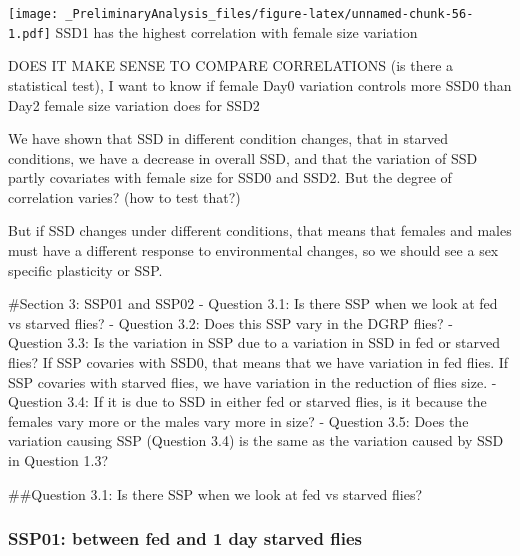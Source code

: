 \documentclass[
]{article}
\newenvironment{Shaded}{\begin{snugshade}}{\end{snugshade}}
\newcommand{\CommentTok}[1]{\textcolor[rgb]{0.56,0.35,0.01}{\textit{#1}}}
\newcommand{\DataTypeTok}[1]{\textcolor[rgb]{0.13,0.29,0.53}{#1}}
\newcommand{\DecValTok}[1]{\textcolor[rgb]{0.00,0.00,0.81}{#1}}
\newcommand{\KeywordTok}[1]{\textcolor[rgb]{0.13,0.29,0.53}{\textbf{#1}}}
\newcommand{\NormalTok}[1]{#1}
\newcommand{\OperatorTok}[1]{\textcolor[rgb]{0.81,0.36,0.00}{\textbf{#1}}}
\newcommand{\OtherTok}[1]{\textcolor[rgb]{0.56,0.35,0.01}{#1}}
\newcommand{\StringTok}[1]{\textcolor[rgb]{0.31,0.60,0.02}{#1}}
\begin{document}
\texttt{[image: \_PreliminaryAnalysis\_files/figure-latex/unnamed-chunk-56-1.pdf]}
SSD1 has the highest correlation with female size variation

DOES IT MAKE SENSE TO COMPARE CORRELATIONS (is there a statistical
test), I want to know if female Day0 variation controls more SSD0 than
Day2 female size variation does for SSD2

We have shown that SSD in different condition changes, that in starved
conditions, we have a decrease in overall SSD, and that the variation of
SSD partly covariates with female size for SSD0 and SSD2. But the degree
of correlation varies? (how to test that?)

But if SSD changes under different conditions, that means that females
and males must have a different response to environmental changes, so we
should see a sex specific plasticity or SSP.

\#Section 3: SSP01 and SSP02 - Question 3.1: Is there SSP when we look
at fed vs starved flies? - Question 3.2: Does this SSP vary in the DGRP
flies? - Question 3.3: Is the variation in SSP due to a variation in SSD
in fed or starved flies? If SSP covaries with SSD0, that means that we
have variation in fed flies. If SSP covaries with starved flies, we have
variation in the reduction of flies size. - Question 3.4: If it is due
to SSD in either fed or starved flies, is it because the females vary
more or the males vary more in size? - Question 3.5: Does the variation
causing SSP (Question 3.4) is the same as the variation caused by SSD in
Question 1.3?

\#\#Question 3.1: Is there SSP when we look at fed vs starved flies?

\hypertarget{ssp01-between-fed-and-1-day-starved-flies}{%
\subsubsection{SSP01: between fed and 1 day starved
flies}\label{ssp01-between-fed-and-1-day-starved-flies}}

\begin{Shaded}
\end{Shaded}
\end{document}
